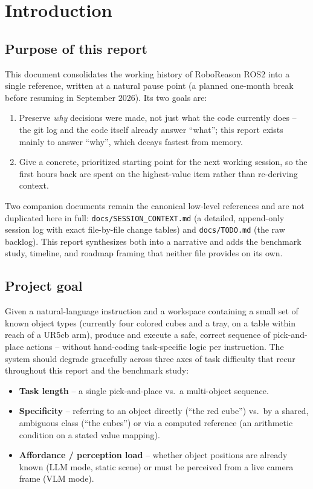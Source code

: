 \section{Introduction}
\label{sec:introduction}

\subsection{Purpose of this report}

This document consolidates the working history of RoboReason ROS2 into a
single reference, written at a natural pause point (a planned one-month
break before resuming in September 2026). Its two goals are:

\begin{enumerate}[nosep]
  \item Preserve \emph{why} decisions were made, not just what the code
    currently does -- the git log and the code itself already answer
    ``what''; this report exists mainly to answer ``why'', which decays
    fastest from memory.
  \item Give a concrete, prioritized starting point for the next working
    session, so the first hours back are spent on the highest-value item
    rather than re-deriving context.
\end{enumerate}

Two companion documents remain the canonical low-level references and are
not duplicated here in full: \texttt{docs/SESSION\_CONTEXT.md} (a detailed,
append-only session log with exact file-by-file change tables) and
\texttt{docs/TODO.md} (the raw backlog). This report synthesizes both into a
narrative and adds the benchmark study, timeline, and roadmap framing that
neither file provides on its own.

\subsection{Project goal}

Given a natural-language instruction and a workspace containing a small set
of known object types (currently four colored cubes and a tray, on a table
within reach of a UR5cb arm), produce and execute a safe, correct sequence of
pick-and-place actions -- without hand-coding task-specific logic per
instruction. The system should degrade gracefully across three axes of task
difficulty that recur throughout this report and the benchmark study:

\begin{itemize}[nosep]
  \item \textbf{Task length} -- a single pick-and-place vs.\ a multi-object
    sequence.
  \item \textbf{Specificity} -- referring to an object directly (``the red
    cube'') vs.\ by a shared, ambiguous class (``the cubes'') or via a
    computed reference (an arithmetic condition on a stated value mapping).
  \item \textbf{Affordance / perception load} -- whether object positions are
    already known (LLM mode, static scene) or must be perceived from a live
    camera frame (VLM mode).
\end{itemize}

